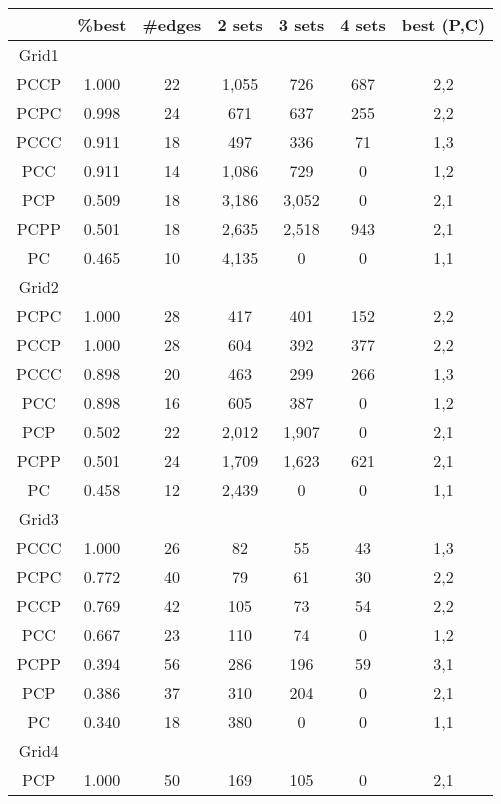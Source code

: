 \documentclass[a4paper]{article}
\begin{document}
\begin{table}
\begin{center} \small
\begin{tabular}{ | c | c | c | c | c | c | c | }
\hline
 & \%\/best & \#edges & 2 sets & 3 sets & 4 sets & best (P,C) \\ \hline \hline
Grid1 \\ \hline \hline
PCCP & 1.000 & 22 & 1,055 & 726 & 687 & 2,2 \\ \hline
PCPC & 0.998 & 24 & 671 & 637 & 255 & 2,2 \\ \hline
PCCC & 0.911 & 18 & 497 & 336 & 71 & 1,3 \\ \hline
PCC & 0.911 & 14 & 1,086 & 729 & 0 & 1,2 \\ \hline
PCP & 0.509 & 18 & 3,186 & 3,052 & 0 & 2,1 \\ \hline
PCPP & 0.501 & 18 & 2,635 & 2,518 & 943 & 2,1 \\ \hline
PC & 0.465 & 10 & 4,135 & 0 & 0 & 1,1 \\ \hline \hline
Grid2 \\ \hline \hline
PCPC & 1.000 & 28 & 417 & 401 & 152 & 2,2 \\ \hline
PCCP & 1.000 & 28 & 604 & 392 & 377 & 2,2 \\ \hline
PCCC & 0.898 & 20 & 463 & 299 & 266 & 1,3 \\ \hline
PCC & 0.898 & 16 & 605 & 387 & 0 & 1,2 \\ \hline
PCP & 0.502 & 22 & 2,012 & 1,907 & 0 & 2,1 \\ \hline
PCPP & 0.501 & 24 & 1,709 & 1,623 & 621 & 2,1 \\ \hline
PC & 0.458 & 12 & 2,439 & 0 & 0 & 1,1 \\ \hline \hline
Grid3 \\ \hline \hline
PCCC & 1.000 & 26 & 82 & 55 & 43 & 1,3 \\ \hline
PCPC & 0.772 & 40 & 79 & 61 & 30 & 2,2 \\ \hline
PCCP & 0.769 & 42 & 105 & 73 & 54 & 2,2 \\ \hline
PCC & 0.667 & 23 & 110 & 74 & 0 & 1,2 \\ \hline
PCPP & 0.394 & 56 & 286 & 196 & 59 & 3,1 \\ \hline
PCP & 0.386 & 37 & 310 & 204 & 0 & 2,1 \\ \hline
PC & 0.340 & 18 & 380 & 0 & 0 & 1,1 \\ \hline \hline
Grid4 \\ \hline \hline
PCP & 1.000 & 50 & 169 & 105 & 0 & 2,1 \\ \hline

\end{tabular}
\end{center}
\end{table}
\end{document}
